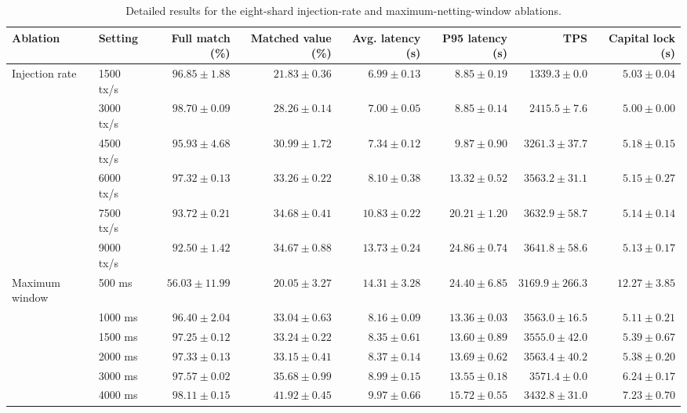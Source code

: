 \begin{table}[t]
\centering
\caption{Detailed results for the eight-shard injection-rate and maximum-netting-window ablations.}
\label{tab:shard8-ablation}
\small
\setlength{\tabcolsep}{3.5pt}
\begin{tabular}{llrrrrrr}
\toprule
Ablation & Setting & Full match (\%) & Matched value (\%) & Avg. latency (s) & P95 latency (s) & TPS & Capital lock (s) \\
\midrule
Injection rate & 1500 tx/s & $96.85 \pm 1.88$ & $21.83 \pm 0.36$ & $6.99 \pm 0.13$ & $8.85 \pm 0.19$ & $1339.3 \pm 0.0$ & $5.03 \pm 0.04$ \\
 & 3000 tx/s & $98.70 \pm 0.09$ & $28.26 \pm 0.14$ & $7.00 \pm 0.05$ & $8.85 \pm 0.14$ & $2415.5 \pm 7.6$ & $5.00 \pm 0.00$ \\
 & 4500 tx/s & $95.93 \pm 4.68$ & $30.99 \pm 1.72$ & $7.34 \pm 0.12$ & $9.87 \pm 0.90$ & $3261.3 \pm 37.7$ & $5.18 \pm 0.15$ \\
 & 6000 tx/s & $97.32 \pm 0.13$ & $33.26 \pm 0.22$ & $8.10 \pm 0.38$ & $13.32 \pm 0.52$ & $3563.2 \pm 31.1$ & $5.15 \pm 0.27$ \\
 & 7500 tx/s & $93.72 \pm 0.21$ & $34.68 \pm 0.41$ & $10.83 \pm 0.22$ & $20.21 \pm 1.20$ & $3632.9 \pm 58.7$ & $5.14 \pm 0.14$ \\
 & 9000 tx/s & $92.50 \pm 1.42$ & $34.67 \pm 0.88$ & $13.73 \pm 0.24$ & $24.86 \pm 0.74$ & $3641.8 \pm 58.6$ & $5.13 \pm 0.17$ \\
\midrule
Maximum window & 500 ms & $56.03 \pm 11.99$ & $20.05 \pm 3.27$ & $14.31 \pm 3.28$ & $24.40 \pm 6.85$ & $3169.9 \pm 266.3$ & $12.27 \pm 3.85$ \\
 & 1000 ms & $96.40 \pm 2.04$ & $33.04 \pm 0.63$ & $8.16 \pm 0.09$ & $13.36 \pm 0.03$ & $3563.0 \pm 16.5$ & $5.11 \pm 0.21$ \\
 & 1500 ms & $97.25 \pm 0.12$ & $33.24 \pm 0.22$ & $8.35 \pm 0.61$ & $13.60 \pm 0.89$ & $3555.0 \pm 42.0$ & $5.39 \pm 0.67$ \\
 & 2000 ms & $97.33 \pm 0.13$ & $33.15 \pm 0.41$ & $8.37 \pm 0.14$ & $13.69 \pm 0.62$ & $3563.4 \pm 40.2$ & $5.38 \pm 0.20$ \\
 & 3000 ms & $97.57 \pm 0.02$ & $35.68 \pm 0.99$ & $8.99 \pm 0.15$ & $13.55 \pm 0.18$ & $3571.4 \pm 0.0$ & $6.24 \pm 0.17$ \\
 & 4000 ms & $98.11 \pm 0.15$ & $41.92 \pm 0.45$ & $9.97 \pm 0.66$ & $15.72 \pm 0.55$ & $3432.8 \pm 31.0$ & $7.23 \pm 0.70$ \\
\bottomrule
\end{tabular}
\end{table}

